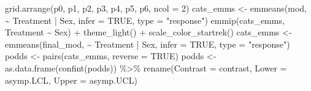 \documentclass[12pt]{article}
\newenvironment{Shaded}{\begin{snugshade}}{\end{snugshade}}
\newcommand{\AttributeTok}[1]{\textcolor[rgb]{0.77,0.63,0.00}{#1}}
\newcommand{\ConstantTok}[1]{\textcolor[rgb]{0.00,0.00,0.00}{#1}}
\newcommand{\DecValTok}[1]{\textcolor[rgb]{0.00,0.00,0.81}{#1}}
\newcommand{\FunctionTok}[1]{\textcolor[rgb]{0.00,0.00,0.00}{#1}}
\newcommand{\NormalTok}[1]{#1}
\newcommand{\OtherTok}[1]{\textcolor[rgb]{0.56,0.35,0.01}{#1}}
\newcommand{\SpecialCharTok}[1]{\textcolor[rgb]{0.00,0.00,0.00}{#1}}
\newcommand{\StringTok}[1]{\textcolor[rgb]{0.31,0.60,0.02}{#1}}
\begin{document}
\begin{Shaded}
\begin{Highlighting}[]
\FunctionTok{grid.arrange}\NormalTok{(p0, p1, p2, p3, p4, p5, p6, }\AttributeTok{ncol =} \DecValTok{2}\NormalTok{)}
\NormalTok{cats\_emms }\OtherTok{\textless{}{-}} \FunctionTok{emmeans}\NormalTok{(mod, }\SpecialCharTok{\textasciitilde{}}\NormalTok{ Treatment }\SpecialCharTok{|}\NormalTok{ Sex, }\AttributeTok{infer =} \ConstantTok{TRUE}\NormalTok{, }\AttributeTok{type =} \StringTok{"response"}\NormalTok{)}
\FunctionTok{emmip}\NormalTok{(cats\_emms, Treatment }\SpecialCharTok{\textasciitilde{}}\NormalTok{ Sex) }\SpecialCharTok{+} 
  \FunctionTok{theme\_light}\NormalTok{() }\SpecialCharTok{+} \FunctionTok{scale\_color\_startrek}\NormalTok{()}
\NormalTok{cats\_emms }\OtherTok{\textless{}{-}} \FunctionTok{emmeans}\NormalTok{(final\_mod, }\SpecialCharTok{\textasciitilde{}}\NormalTok{ Treatment }\SpecialCharTok{|}\NormalTok{ Sex, }\AttributeTok{infer =} \ConstantTok{TRUE}\NormalTok{, }\AttributeTok{type =} \StringTok{"response"}\NormalTok{)}
\NormalTok{podds }\OtherTok{\textless{}{-}} \FunctionTok{pairs}\NormalTok{(cats\_emms, }\AttributeTok{reverse =} \ConstantTok{TRUE}\NormalTok{)}
\NormalTok{podds }\OtherTok{\textless{}{-}} \FunctionTok{as.data.frame}\NormalTok{(}\FunctionTok{confint}\NormalTok{(podds)) }\SpecialCharTok{\%\textgreater{}\%}
  \FunctionTok{rename}\NormalTok{(}\AttributeTok{Contrast =}\NormalTok{ contrast, }\AttributeTok{Lower =}\NormalTok{ asymp.LCL, }\AttributeTok{Upper =}\NormalTok{ asymp.UCL)}


\end{Highlighting}
\end{Shaded}
\end{document}
